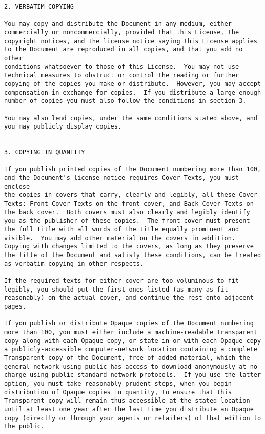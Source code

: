 \documentclass[12pt]{article}
\begin{document}
\begin{verbatim}
2. VERBATIM COPYING

You may copy and distribute the Document in any medium, either
commercially or noncommercially, provided that this License, the
copyright notices, and the license notice saying this License applies
to the Document are reproduced in all copies, and that you add no other
conditions whatsoever to those of this License.  You may not use
technical measures to obstruct or control the reading or further
copying of the copies you make or distribute.  However, you may accept
compensation in exchange for copies.  If you distribute a large enough
number of copies you must also follow the conditions in section 3.

You may also lend copies, under the same conditions stated above, and
you may publicly display copies.


3. COPYING IN QUANTITY

If you publish printed copies of the Document numbering more than 100,
and the Document's license notice requires Cover Texts, you must enclose
the copies in covers that carry, clearly and legibly, all these Cover
Texts: Front-Cover Texts on the front cover, and Back-Cover Texts on
the back cover.  Both covers must also clearly and legibly identify
you as the publisher of these copies.  The front cover must present
the full title with all words of the title equally prominent and
visible.  You may add other material on the covers in addition.
Copying with changes limited to the covers, as long as they preserve
the title of the Document and satisfy these conditions, can be treated
as verbatim copying in other respects.

If the required texts for either cover are too voluminous to fit
legibly, you should put the first ones listed (as many as fit
reasonably) on the actual cover, and continue the rest onto adjacent
pages.

If you publish or distribute Opaque copies of the Document numbering
more than 100, you must either include a machine-readable Transparent
copy along with each Opaque copy, or state in or with each Opaque copy
a publicly-accessible computer-network location containing a complete
Transparent copy of the Document, free of added material, which the
general network-using public has access to download anonymously at no
charge using public-standard network protocols.  If you use the latter
option, you must take reasonably prudent steps, when you begin
distribution of Opaque copies in quantity, to ensure that this
Transparent copy will remain thus accessible at the stated location
until at least one year after the last time you distribute an Opaque
copy (directly or through your agents or retailers) of that edition to
the public.


\end{verbatim}
\end{document}
